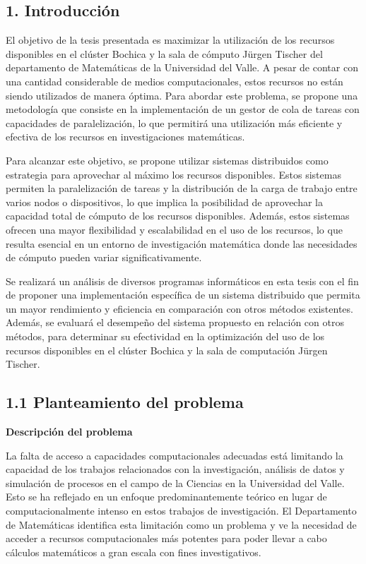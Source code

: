 \begin{spacing}{1.5}
  \begin{tightcenter}
    \section{1. Introducción}
    \mylinespacing
  \end{tightcenter}

  El objetivo de la tesis presentada es maximizar la utilización de los recursos disponibles en el clúster Bochica y la sala de cómputo Jürgen Tischer del departamento de Matemáticas de la Universidad del Valle. A pesar de contar con una cantidad considerable de medios computacionales, estos recursos no están siendo utilizados de manera óptima. Para abordar este problema, se propone una metodología que consiste en la implementación de un gestor de cola de tareas con capacidades de paralelización, lo que permitirá una utilización más eficiente y efectiva de los recursos en investigaciones matemáticas.

  Para alcanzar este objetivo, se propone utilizar sistemas distribuidos como estrategia para aprovechar al máximo los recursos disponibles. Estos sistemas permiten la paralelización de tareas y la distribución de la carga de trabajo entre varios nodos o dispositivos, lo que implica la posibilidad de aprovechar la capacidad total de cómputo de los recursos disponibles. Además, estos sistemas ofrecen una mayor flexibilidad y escalabilidad en el uso de los recursos, lo que resulta esencial en un entorno de investigación matemática donde las necesidades de cómputo pueden variar significativamente.

  Se realizará un análisis de diversos programas informáticos en esta tesis con el fin de proponer una implementación específica de un sistema distribuido que permita un mayor rendimiento y eficiencia en comparación con otros métodos existentes. Además, se evaluará el desempeño del sistema propuesto en relación con otros métodos, para determinar su efectividad en la optimización del uso de los recursos disponibles en el clúster Bochica y la sala de computación Jürgen Tischer.

  \subsection{1.1 Planteamiento del problema}

  \textbf{Descripción del problema}

  La falta de acceso a capacidades computacionales adecuadas está limitando la capacidad de los trabajos relacionados con la investigación, análisis de datos y simulación de procesos en el campo de la Ciencias en la Universidad del Valle. Esto se ha reflejado en un enfoque predominantemente teórico en lugar de computacionalmente intenso en estos trabajos de investigación. El Departamento de Matemáticas identifica esta limitación como un problema y ve la necesidad de acceder a recursos computacionales más potentes para poder llevar a cabo cálculos matemáticos a gran escala con fines investigativos.


\end{spacing}

